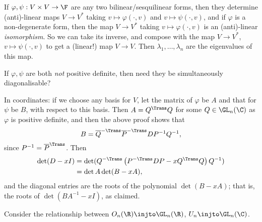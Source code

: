 If $\varphi,\psi: V\times V\to \F$ are any two bilinear/sesquilinear forms, then they determine (anti)-linear maps $V\to V^*$ taking $v\mapsto \varphi(\cdot,v)$ and $v\mapsto\psi(\cdot,v)$, and if $\varphi$ is a non-degenerate form, then the map $V\to V^*$ taking $v\mapsto \varphi(\cdot,v)$ is an (anti)-linear \emph{isomorphism}. So we can take its inverse, and compose with the map $V\to V^*$, $v \mapsto \psi(\cdot,v)$ to get a (linear!) map $V\to V$.
Then $\lambda_1,\ldots,\lambda_n$ are the eigenvalues of this map.

\begin{exercise}
	If $\varphi,\psi$ are both \emph{not} positive definite, then need they be simultaneously diagonalisable? %
\end{exercise}

\begin{remark}
	In coordinates: if we choose any basis for $V$, let the matrix of $\varphi$ be $A$ and that for $\psi$ be $B$, with respect to this basis. Then  $A=Q^\Trans Q$ for some $Q\in\GL_n(\C)$ as $\varphi$ is positive definite, and then the above proof shows that %
	\begin{equation*}
		B=\overline{Q}^{-\Trans} \overline{P}^{-\Trans} DP^{-1} Q^{-1},
	\end{equation*}
	since $P^{-1}=\herm{P}$. Then
	\begin{align*}
		\det(D-xI)
		&= \det(Q^{-\Trans} \left( P^{-\Trans} DP - xQ^\Trans Q \right) Q^{-1}) \\
		&= \det A \det(B-xA),
	\end{align*}
	and the diagonal entries are the roots of the polynomial $\det(B-xA)$; that is, the roots of $\det(BA^{-1}-xI)$, as claimed. %
\end{remark}

Consider the relationship between $O_n(\R) \injto \GL_n(\R)$, $U_n \injto \GL_n(\C)$.

